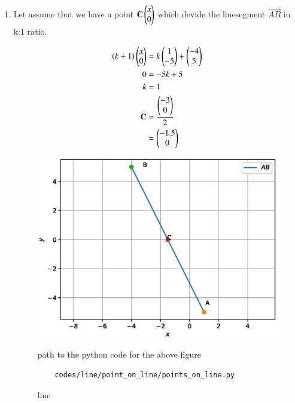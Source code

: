 \renewcommand{\theequation}{\theenumi}
\begin{enumerate}[label=\arabic*.,ref=\thesubsection.\theenumi]

\item 
Let assume that we have a point $\mathbf{C}\begin{pmatrix}x\\0\end{pmatrix}$ which devide the linesegment $\vec{AB} $ in k:1 ratio.

\begin{align}
\left(k+1\right)\begin{pmatrix}x\\0\end{pmatrix} &=k\begin{pmatrix}1\\-5\end{pmatrix} + \begin{pmatrix}-4\\5\end{pmatrix}
\\
0 &= -5k + 5
\\
k&= 1
\\
\mathbf{C} &= \frac{\begin{pmatrix}-3\\0\end{pmatrix}}{2} 
\\&= \begin{pmatrix}-1.5\\0\end{pmatrix}
\end{align}
\begin{figure}[!ht]
	\centering
	\includegraphics[width=\columnwidth]{./figures/line/point_on_line/point_on_line.eps}
	\caption{line }
	\label{fig:line}
	path to the python code for the above figure 
	\begin{lstlisting}
	codes/line/point_on_line/points_on_line.py
	\end{lstlisting}
\end{figure}


\end{enumerate}